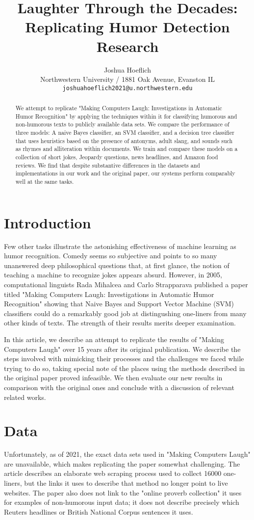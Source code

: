 \documentclass[11pt,a4paper]{article}
\title{Laughter Through the Decades: Replicating Humor Detection Research}
\author{Joshua Hoeflich \\
  Northwestern University / 1881 Oak Avenue, Evanston IL \\
  \texttt{joshuahoeflich2021@u.northwestern.edu} \\
  }
\date{}
\begin{document}
\maketitle
\begin{abstract}
  We attempt to replicate "Making Computers Laugh: Investigations in Automatic Humor Recognition" by applying the techniques within it for classifying humorous and non-humorous texts to publicly available data sets. \cite{mihalcea2005making} We compare the performance of three models: A naive Bayes classifier, an SVM classifier, and a decision tree classifier that uses heuristics based on the presence of antonyms, adult slang, and sounds such as rhymes and alliteration within documents. We train and compare these models on a collection of short jokes, Jeopardy questions, news headlines, and Amazon food reviews. We find that despite substantive differences in the datasets and implementations in our work and the original paper, our systems perform comparably well at the same tasks.
\end{abstract}

\section{Introduction}
Few other tasks illustrate the astonishing effectiveness of machine learning as humor recognition. Comedy seems so subjective and points to so many unanswered deep philosophical questions that, at first glance, the notion of teaching a machine to recognize jokes appears absurd. However, in 2005, computational linguists Rada Mihalcea and Carlo Strapparava published a paper titled "Making Computers Laugh: Investigations in Automatic Humor Recognition" showing that Naive Bayes and Support Vector Machine (SVM) classifiers could do a remarkably good job at distingushing one-liners from many other kinds of texts. The strength of their results merits deeper examination.

In this article, we describe an attempt to replicate the results of "Making Computers Laugh" over 15 years after its original publication. We describe the steps involved with mimicking their processes and the challenges we faced while trying to do so, taking special note of the places using the methods described in the original paper proved infeasible. We then evaluate our new results in comparison with the original ones and conclude with a discussion of relevant related works.

\section{Data}
Unfortunately, as of 2021, the exact data sets used in "Making Computers Laugh" are unavailable, which makes replicating the paper somewhat challenging. The article describes an elaborate web scraping process used to collect 16000 one-liners, but the links it uses to describe that method no longer point to live websites. The paper also does not link to the "online proverb collection" it uses for examples of non-humorous input data; it does not describe precisely which Reuters headlines or British National Corpus sentences it uses.
\end{document}
